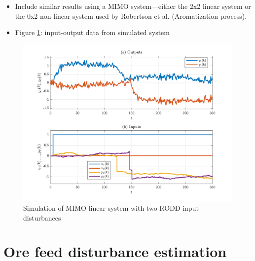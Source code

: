 \begin{itemize}
	\item Include similar results using a MIMO system—either the 2x2 linear system or the 0x2 non-linear system used by Robertson et al. (Aromatization process).
	\item Figure \ref{fig:rodd-obs-sim-2-4-ioplot}: input-output data from simulated system
\end{itemize}

\begin{figure}[htp]
	\centering
	\includegraphics[width=15cm]{images/rod-obs-sim-2-4-ioplot.pdf}
	\caption{Simulation of MIMO linear system with two RODD input disturbances}
	\label{fig:rodd-obs-sim-2-4-ioplot}
\end{figure}

\section{Ore feed disturbance estimation}

